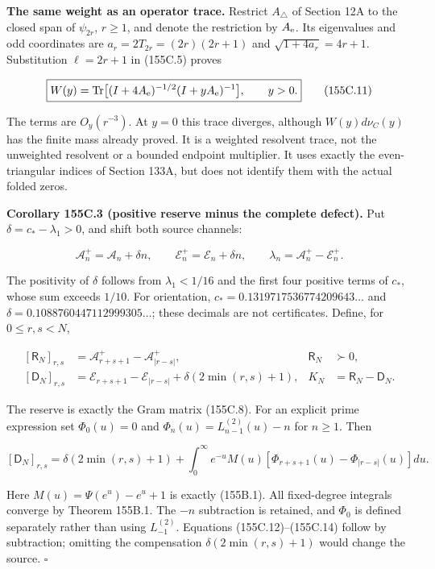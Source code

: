 \documentclass[
  11pt,
]{book}
\begin{document}
\textbf{The same weight as an operator trace.} Restrict \(A_\triangle\)
of Section 12A to the closed span of \(\psi_{2r}\), \(r\ge1\), and
denote the restriction by \(A_{\rm e}\). Its eigenvalues and odd
coordinates are \(a_r=2T_{2r}=(2r)(2r+1)\) and \(\sqrt{1+4a_r}=4r+1\).
Substitution \(\ell=2r+1\) in (155C.5) proves

\[
\boxed{W(y)=\operatorname{Tr}
\bigl[(I+4A_{\rm e})^{-1/2}(I+yA_{\rm e})^{-1}\bigr],\qquad y>0.}
\tag{155C.11}
\]

The terms are \(O_y(r^{-3})\). At \(y=0\) this trace diverges, although
\(W(y)d\nu_C(y)\) has the finite mass already proved. It is a weighted
resolvent trace, not the unweighted resolvent or a bounded endpoint
multiplier. It uses exactly the even-triangular indices of Section 133A,
but does not identify them with the actual folded zeros.

\textbf{Corollary 155C.3 (positive reserve minus the complete defect).}
Put \(\delta=c_*-\lambda_1>0\), and shift both source channels:

\[
\mathcal A_n^+=\mathcal A_n+\delta n,\qquad
\mathcal E_n^+=\mathcal E_n+\delta n,\qquad
\lambda_n=\mathcal A_n^+-\mathcal E_n^+.
\tag{155C.12}
\]

The positivity of \(\delta\) follows from \(\lambda_1<1/16\) and the
first four positive terms of \(c_*\), whose sum exceeds \(1/10\). For
orientation, \(c_*=0.1319717536774209643\ldots\) and
\(\delta=0.1088760447112999305\ldots\); these decimals are not
certificates. Define, for \(0\le r,s<N\),

\[
\begin{aligned}
[\mathsf R_N]_{r,s}&=\mathcal A_{r+s+1}^+-\mathcal A_{|r-s|}^+,
 &\mathsf R_N&\succ0,\\
[\mathsf D_N]_{r,s}&=\mathcal E_{r+s+1}-\mathcal E_{|r-s|}
 +\delta(2\min(r,s)+1),
 &K_N&=\mathsf R_N-\mathsf D_N.
\end{aligned}
\tag{155C.13}
\]

The reserve is exactly the Gram matrix (155C.8). For an explicit prime
expression set \(\Phi_0(u)=0\) and \(\Phi_n(u)=L_{n-1}^{(2)}(u)-n\) for
\(n\ge1\). Then

\[
[\mathsf D_N]_{r,s}=\delta(2\min(r,s)+1)
+\int_0^\infty e^{-u}M(u)
 [\Phi_{r+s+1}(u)-\Phi_{|r-s|}(u)]du.
\tag{155C.14}
\]

Here \(M(u)=\Psi(e^u)-e^u+1\) is exactly (155B.1). All fixed-degree
integrals converge by Theorem 155B.1. The \(-n\) subtraction is
retained, and \(\Phi_0\) is defined separately rather than using
\(L_{-1}^{(2)}\). Equations (155C.12)--(155C.14) follow by subtraction;
omitting the compensation \(\delta(2\min(r,s)+1)\) would change the
source. \(\square\)
\end{document}

